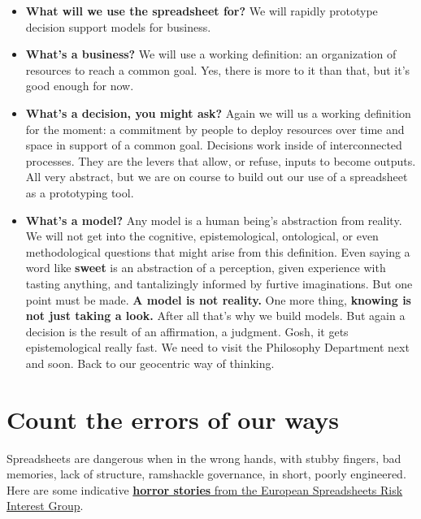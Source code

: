 \documentclass[
]{book}
\begin{document}
\begin{itemize}
\item
  \textbf{What will we use the spreadsheet for?} We will rapidly prototype decision support models for business.
\item
  \textbf{What's a business?} We will use a working definition: an organization of resources to reach a common goal. Yes, there is more to it than that, but it's good enough for now.
\item
  \textbf{What's a decision, you might ask?} Again we will us a working definition for the moment: a commitment by people to deploy resources over time and space in support of a common goal. Decisions work inside of interconnected processes. They are the levers that allow, or refuse, inputs to become outputs. All very abstract, but we are on course to build out our use of a spreadsheet as a prototyping tool.
\item
  \textbf{What's a model?} Any model is a human being's abstraction from reality. We will not get into the cognitive, epistemological, ontological, or even methodological questions that might arise from this definition. Even saying a word like \textbf{sweet} is an abstraction of a perception, given experience with tasting anything, and tantalizingly informed by furtive imaginations. But one point must be made. \textbf{A model is not reality.} One more thing, \textbf{knowing is not just taking a look.} After all that's why we build models. But again a decision is the result of an affirmation, a judgment. Gosh, it gets epistemological really fast. We need to visit the Philosophy Department next and soon. Back to our geocentric way of thinking.
\end{itemize}

\hypertarget{count-the-errors-of-our-ways}{%
\section{Count the errors of our ways}\label{count-the-errors-of-our-ways}}

Spreadsheets are dangerous when in the wrong hands, with stubby fingers, bad memories, lack of structure, ramshackle governance, in short, poorly engineered. Here are some indicative \href{http://www.eusprig.org/horror-stories.htm}{\textbf{horror stories} from the European Spreadsheets Risk Interest Group}.
\end{document}

